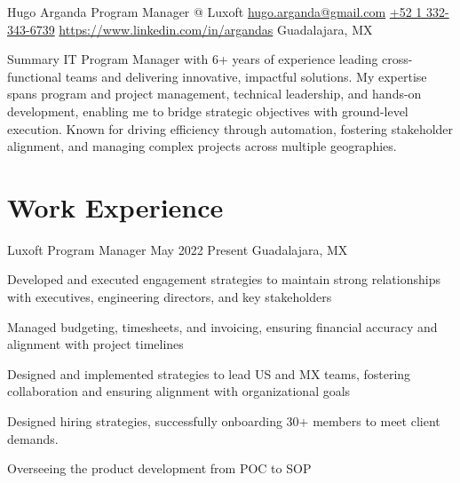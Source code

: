 \documentclass{resume} %
\begin{document}

\customheader
    {Hugo Arganda}
    {Program Manager @ Luxoft}
    {\href{mailto:hugo.arganda@gmail.com}{hugo.arganda@gmail.com}}
    {\href{https://wa.me/5213323436739}{+52 1 332-343-6739}}
    {\href{https://www.linkedin.com/in/argandas}{https://www.linkedin.com/in/argandas}}
    {Guadalajara, MX}



\summary
{Summary}
    {IT Program Manager with 6+ years of experience leading cross-functional teams and delivering innovative, impactful solutions. My expertise spans program and project management, technical leadership, and hands-on development, enabling me to bridge strategic objectives with ground-level execution. Known for driving efficiency through automation, fostering stakeholder alignment, and managing complex projects across multiple geographies.}



\section{Work Experience}


\job
    {Luxoft}
    {Program Manager}
    {May 2022}
    {Present}
    {Guadalajara, MX}
    {
    \begin{itemize-bullets}
    \item{Developed and executed engagement strategies to maintain strong relationships with executives, engineering directors, and key stakeholders}
    \item{Managed budgeting, timesheets, and invoicing, ensuring financial accuracy and alignment with project timelines}
    \item{Designed and implemented strategies to lead US and MX teams, fostering collaboration and ensuring alignment with organizational goals}
    \item{Designed hiring strategies, successfully onboarding 30+ members to meet client demands.}
    \item{Overseeing the product development from POC to SOP}
    \end{itemize-bullets}
    }
\end{document}
